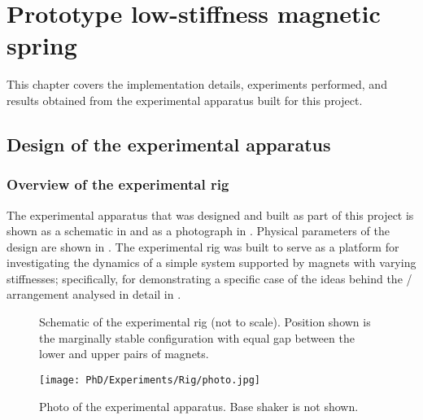 \documentclass[11pt,a4paper]{memoir}
\begin{document}
\chapter{Prototype low-stiffness magnetic spring}


This chapter covers the implementation details, experiments performed,
and results obtained from the experimental apparatus built for this
project.

\section{Design of the experimental apparatus}

\subsection{Overview of the experimental rig}

The experimental apparatus that was designed and built as part of this project
is shown as a schematic in  and as a photograph in
. Physical parameters of the design are shown in
. The experimental rig was built to serve as a platform for
investigating the dynamics of a simple system supported by magnets with
varying stiffnesses; specifically, for demonstrating a specific case of
the ideas behind the \qzs/ arrangement analysed in detail in .

\begin{figure}
  \begin{wide}
  \end{wide}
  \caption{
    Schematic of the experimental rig (not to scale). Position shown is
    the marginally stable configuration with equal gap between the lower
    and upper pairs of magnets.}
\end{figure}

\begin{figure}
  \texttt{[image: PhD/Experiments/Rig/photo.jpg]}
  \caption{Photo of the experimental apparatus. Base shaker is not shown.}
\end{figure}
\end{document}
